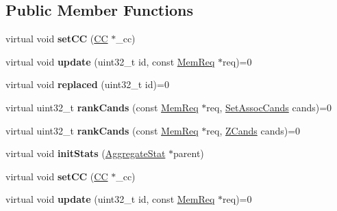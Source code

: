 \subsection*{Public Member Functions}
\begin{DoxyCompactItemize}
\item 
\hypertarget{classReplPolicy_a3e4b6f77f73a08be162d72414dab8b02}{virtual void {\bfseries set\-C\-C} (\hyperlink{classCC}{C\-C} $\ast$\-\_\-cc)}\label{classReplPolicy_a3e4b6f77f73a08be162d72414dab8b02}

\item 
\hypertarget{classReplPolicy_a177f7fdd8a2beb82611cfa56390c1b77}{virtual void {\bfseries update} (uint32\-\_\-t id, const \hyperlink{structMemReq}{Mem\-Req} $\ast$req)=0}\label{classReplPolicy_a177f7fdd8a2beb82611cfa56390c1b77}

\item 
\hypertarget{classReplPolicy_a52cd8ad55c43817d5f48e819f47ddc7a}{virtual void {\bfseries replaced} (uint32\-\_\-t id)=0}\label{classReplPolicy_a52cd8ad55c43817d5f48e819f47ddc7a}

\item 
\hypertarget{classReplPolicy_af630792de319f21796dd4348d69611e2}{virtual uint32\-\_\-t {\bfseries rank\-Cands} (const \hyperlink{structMemReq}{Mem\-Req} $\ast$req, \hyperlink{structSetAssocCands}{Set\-Assoc\-Cands} cands)=0}\label{classReplPolicy_af630792de319f21796dd4348d69611e2}

\item 
\hypertarget{classReplPolicy_a7ddfe77082cf23c6d7fdc8dae67ab8c0}{virtual uint32\-\_\-t {\bfseries rank\-Cands} (const \hyperlink{structMemReq}{Mem\-Req} $\ast$req, \hyperlink{structZCands}{Z\-Cands} cands)=0}\label{classReplPolicy_a7ddfe77082cf23c6d7fdc8dae67ab8c0}

\item 
\hypertarget{classReplPolicy_a4a7eff9648fcd8ce037fa16da5752810}{virtual void {\bfseries init\-Stats} (\hyperlink{classAggregateStat}{Aggregate\-Stat} $\ast$parent)}\label{classReplPolicy_a4a7eff9648fcd8ce037fa16da5752810}

\item 
\hypertarget{classReplPolicy_a3e4b6f77f73a08be162d72414dab8b02}{virtual void {\bfseries set\-C\-C} (\hyperlink{classCC}{C\-C} $\ast$\-\_\-cc)}\label{classReplPolicy_a3e4b6f77f73a08be162d72414dab8b02}

\item 
\hypertarget{classReplPolicy_a177f7fdd8a2beb82611cfa56390c1b77}{virtual void {\bfseries update} (uint32\-\_\-t id, const \hyperlink{structMemReq}{Mem\-Req} $\ast$req)=0}\label{classReplPolicy_a177f7fdd8a2beb82611cfa56390c1b77}


\end{DoxyCompactItemize}
